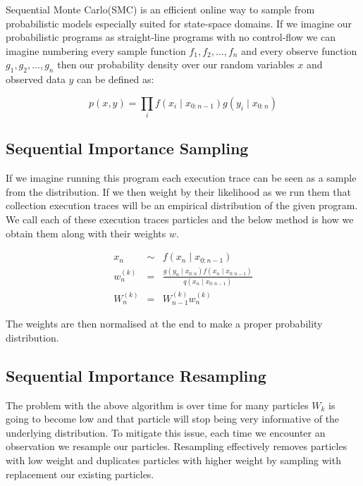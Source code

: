 \documentclass[
]{ceurart}
\begin{document}
Sequential Monte Carlo\cite{chopin2020introduction}(SMC) is an efficient
online way to sample from probabilistic models especially suited for
state-space domains. If we imagine our probabilistic programs as
straight-line programs with no control-flow we can imagine numbering
every sample function $f_1, f_2, \ldots, f_n$ and every observe
function $g_1, g_2, \ldots, g_n$ then our probability density over our
random variables $x$ and observed data $y$ can be defined as:

\begin{equation}
  p(x, y) = \prod_i f(x_i \mid x_{0:n-1})g(y_i \mid x_{0:n})
\end{equation}

\subsection{Sequential Importance Sampling}

If we imagine running this program each execution trace can be seen as
a sample from the distribution. If we then weight by their likelihood
as we run them that collection execution traces will be an empirical
distribution of the given program. We call each of these execution traces
particles and the below method is how we obtain them along with their weights $w$.

\begin{eqnarray}
  x_n &\sim& f(x_n \mid x_{0:n-1}) \\
  w_n^{(k)} &=& \frac{g(y_n \mid x_{0:n})f(x_n \mid x_{0:n-1})}{q(x_n \mid x_{0:n-1})} \\
  W_n^{(k)} &=& W_{n-1}^{(k)} w_n^{(k)}
\end{eqnarray}

The weights are then normalised at the end to make a proper probability distribution.

\subsection{Sequential Importance Resampling}

The problem with the above algorithm is over time for many particles
$W_k$ is going to become low and that particle will stop being very
informative of the underlying distribution. To mitigate this issue,
each time we encounter an observation we resample our particles. Resampling
effectively removes particles with low weight and duplicates particles
with higher weight by sampling with replacement our existing particles.
\end{document}
